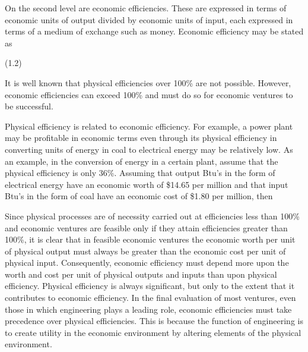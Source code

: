 On the second level are economic efficiencies. These are expressed in terms of economic units of output divided by economic units of input, each expressed in terms of a medium of exchange such as money. Economic efficiency may be stated as

				(1.2)

It is well known that physical efficiencies over 100\% are not possible. However, economic efficiencies can exceed 100\% and must do so for economic ventures to be successful.

Physical efficiency is related to economic efficiency. For example, a power plant may be profitable in economic terms even through its physical efficiency in converting units of energy in coal to electrical energy may be relatively low. As an example, in the conversion of energy in a certain plant, assume that the physical efficiency is only 36\%. Assuming that output Btu’s in the form of electrical energy have an economic worth of \$14.65 per million and that input Btu’s in the form of coal have an economic cost of \$1.80 per million, then

Since physical processes are of necessity carried out at efficiencies less than 100\% and economic ventures are feasible only if they attain efficiencies greater than 100\%, it is clear that in feasible economic ventures the economic worth per unit of physical output must always be greater than the economic cost per unit of physical input. Consequently, economic efficiency must depend more upon the worth and cost per unit of physical outputs and inputs than upon physical efficiency. Physical efficiency is always significant, but only to the extent that it contributes to economic efficiency.
In the final evaluation of most ventures, even those in which engineering plays a leading role, economic efficiencies must take precedence over physical efficiencies. This is because the function of engineering is to create utility in the economic environment by altering elements of the physical environment.